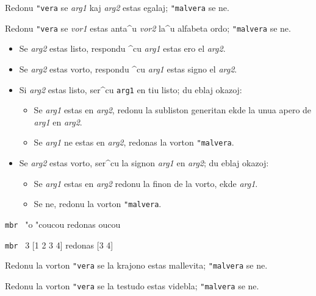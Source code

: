 
Redonu \texttt{"vera} se \textit{arg1} kaj \textit{arg2} estas egalaj;
\texttt{"malvera} se ne.


Redonu \texttt{"vera} se \textit{vor1} estas anta^u \textit{vor2} la^u alfabeta ordo; \texttt{"malvera} se ne.

\begin{itemize}
\item Se \textit{arg2} estas listo, respondu ^cu \textit{arg1} estas
  ero el \textit{arg2}.
\item Se \textit{arg2} estas vorto, respondu ^cu \textit{arg1} estas
  signo el \textit{arg2}.
\end{itemize}

\begin{itemize}
\item Si \textit{arg2} estas listo, ser^cu \texttt{arg1} en tiu listo;
  du eblaj okazoj:
  \begin{itemize}
  \item Se \textit{arg1} estas en \textit{arg2}, redonu la subliston
    generitan ekde la unua apero de \textit{arg1} en \textit{arg2}.
  \item Se \textit{arg1} ne estas en \textit{arg2}, redonas la vorton
    \texttt{"malvera}.
  \end{itemize}
\item Se \textit{arg2} estas vorto, ser^cu la signon \textit{arg1} en \textit{arg2}; du eblaj okazoj:
  \begin{itemize}
  \item Se \textit{arg1} estas en \textit{arg2} redonu la finon de la vorto, ekde \textit{arg1}.
  \item Se ne, redonu la vorton \texttt{"malvera}.
  \end{itemize}
\end{itemize}

\texttt{mbr} \ {}{}"o {}"coucou redonas oucou

\texttt{mbr} \ 3 {[}1 2 3 4{]} redonas {[}3 4{]} 


Redonu la vorton \texttt{"vera} se la krajono estas mallevita;
\texttt{"malvera} se ne.


Redonu la vorton \texttt{"vera} se la testudo estas videbla;
\texttt{"malvera} se ne.


